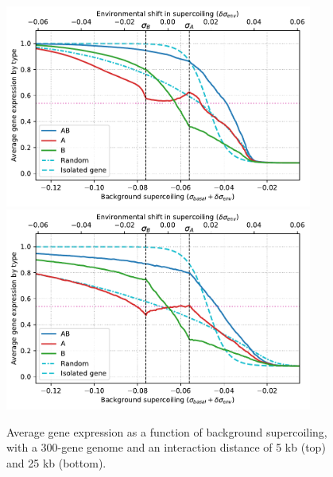 \begin{figure}[H]
\centering
\includegraphics[width=0.9\textwidth]{param/300-genes/interaction-5k/activity_sigmas_avg.pdf}
\includegraphics[width=0.9\textwidth]{param/300-genes/interaction-25k/activity_sigmas_avg.pdf}
\caption[Average gene expression as a function of background supercoiling, with a 300-gene genome]{Average gene expression as a function of background supercoiling, with a 300-gene genome and an interaction distance of 5 kb (top) and 25 kb (bottom).}
\label{fig:param:300genes-activ-by-sigma}
\end{figure}

